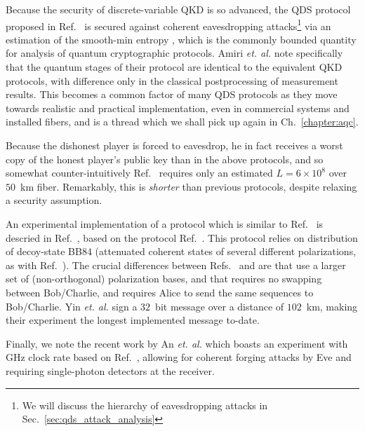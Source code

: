 Because the security of discrete-variable QKD is so advanced, the QDS protocol proposed in Ref.~\cite{Amiri2016} is secured against coherent eavesdropping attacks\footnote{We will discuss the hierarchy of eavesdropping attacks in Sec.~\ref{sec:qds_attack_analysis}} via an estimation of the smooth-min entropy \cite{Konig2009, Tomamichel2016}, which is the commonly bounded quantity for analysis of quantum cryptographic protocols. Amiri \emph{et. al.} note specifically that the quantum stages of their protocol are identical to the equivalent QKD protocols, with difference only in the classical postprocessing of measurement results. This becomes a common factor of many QDS protocols as they move towards realistic and practical implementation, even in commercial systems and installed fibers, and is a thread which we shall pick up again in Ch.~\ref{chapter:aqc}.

Because the dishonest player is forced to eavesdrop, he in fact receives a worst copy of the honest player's public key than in the above protocols, and so somewhat counter-intuitively Ref.~\cite{Amiri2016} requires only an estimated $L = 6\times 10^8$ over $50$~km fiber. Remarkably, this is \emph{shorter} than previous protocols, despite relaxing a security assumption.

An experimental implementation of a protocol which is similar to Ref.~\cite{Amiri2016} is descried in Ref.~\cite{Yin2017c}, based on the protocol Ref.~\cite{Yin2016a}. This protocol relies on distribution of decoy-state BB$84$ (attenuated coherent states of several different polarizations, as with Ref.~\cite{Amiri2016}). The crucial differences between Refs.~\cite{Amiri2016} and \cite{Yin2017c, Yin2016a} are that \cite{Yin2017c, Yin2016a} use a larger set of (non-orthogonal) polarization bases, and that \cite{Yin2017c, Yin2016a} requires no swapping between Bob/Charlie, and requires Alice to send the same sequences to Bob/Charlie. Yin \emph{et. al.} sign a $32$~bit message over a distance of $102$~km, making their experiment the longest implemented message to-date.



Finally, we note the recent work by An \emph{et. al.} \cite{An2019} which boasts an experiment with GHz clock rate based on Ref.~\cite{Amiri2016}, allowing for coherent forging attacks by Eve and requiring single-photon detectors at the receiver.


